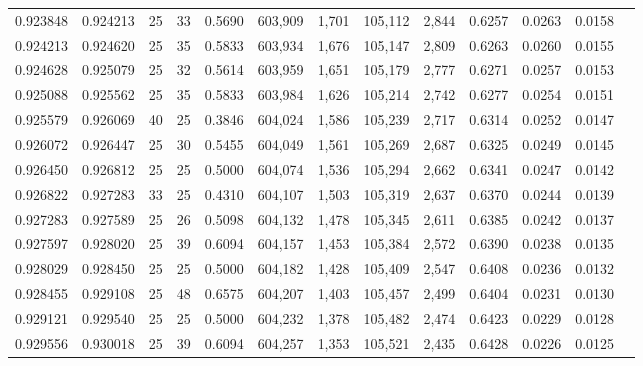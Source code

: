 \begin{tabular}{rrrrrrrrrrrrr}
0.923848 & 0.924213 &    25 &  33 &                                     0.5690 & 603,909 &   1,701 & 105,112 &   2,844 & 0.6257 & 0.0263 & 0.0158 \\
0.924213 & 0.924620 &    25 &  35 &                                     0.5833 & 603,934 &   1,676 & 105,147 &   2,809 & 0.6263 & 0.0260 & 0.0155 \\
0.924628 & 0.925079 &    25 &  32 &                                     0.5614 & 603,959 &   1,651 & 105,179 &   2,777 & 0.6271 & 0.0257 & 0.0153 \\
0.925088 & 0.925562 &    25 &  35 &                                     0.5833 & 603,984 &   1,626 & 105,214 &   2,742 & 0.6277 & 0.0254 & 0.0151 \\
0.925579 & 0.926069 &    40 &  25 &                                     0.3846 & 604,024 &   1,586 & 105,239 &   2,717 & 0.6314 & 0.0252 & 0.0147 \\
0.926072 & 0.926447 &    25 &  30 &                                     0.5455 & 604,049 &   1,561 & 105,269 &   2,687 & 0.6325 & 0.0249 & 0.0145 \\
0.926450 & 0.926812 &    25 &  25 &                                     0.5000 & 604,074 &   1,536 & 105,294 &   2,662 & 0.6341 & 0.0247 & 0.0142 \\
0.926822 & 0.927283 &    33 &  25 &                                     0.4310 & 604,107 &   1,503 & 105,319 &   2,637 & 0.6370 & 0.0244 & 0.0139 \\
0.927283 & 0.927589 &    25 &  26 &                                     0.5098 & 604,132 &   1,478 & 105,345 &   2,611 & 0.6385 & 0.0242 & 0.0137 \\
0.927597 & 0.928020 &    25 &  39 &                                     0.6094 & 604,157 &   1,453 & 105,384 &   2,572 & 0.6390 & 0.0238 & 0.0135 \\
0.928029 & 0.928450 &    25 &  25 &                                     0.5000 & 604,182 &   1,428 & 105,409 &   2,547 & 0.6408 & 0.0236 & 0.0132 \\
0.928455 & 0.929108 &    25 &  48 &                                     0.6575 & 604,207 &   1,403 & 105,457 &   2,499 & 0.6404 & 0.0231 & 0.0130 \\
0.929121 & 0.929540 &    25 &  25 &                                     0.5000 & 604,232 &   1,378 & 105,482 &   2,474 & 0.6423 & 0.0229 & 0.0128 \\
0.929556 & 0.930018 &    25 &  39 &                                     0.6094 & 604,257 &   1,353 & 105,521 &   2,435 & 0.6428 & 0.0226 & 0.0125 \\

\end{tabular}
